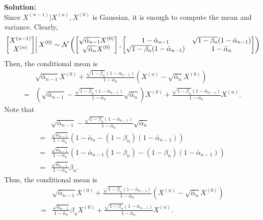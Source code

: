\documentclass[12pt]{article}
\begin{document}
\begin{enumerate}
\begin{solution}
{\bf Solution:}\\
Since $X^{(n-1)}|X^{(n)}, X^{(0)}$ is Gaussian, it is enough to compute the mean and variance.
Clearly,
    \begin{align}
        \left.\begin{bmatrix}
            X^{(n-1)}\\X^{(n)} 
        \end{bmatrix}
        \right| X^{(0)}
        \sim {\mathcal{N}}\left(\begin{bmatrix}\sqrt{\bar{\alpha}_{n-1}}X^{(0)} \\ \sqrt{\bar{\alpha}_{n}}X^{(0)} \\\end{bmatrix},
        \begin{bmatrix}1-\bar{\alpha}_{n-1} & \sqrt{1-\beta_n} (1-\bar{\alpha}_{n-1}) \\
        \sqrt{1-\beta_n} (1-\bar{\alpha}_{n-1}) & 1-\bar{\alpha}_n\end{bmatrix}\right)
    \end{align}
Then, the conditional mean is
\begin{align}
    &\sqrt{\bar{\alpha}_{n-1}} X^{(0)} +\frac{\sqrt{1-\beta_n}(1-\bar{\alpha}_{n-1})}{1-\bar{\alpha}_n} (X^{(n)} - \sqrt{\bar{\alpha}_n}X^{(0)})\nonumber\\
    =& \left(\sqrt{\bar{\alpha}_{n-1}} - \frac{\sqrt{1-\beta_n}(1-\bar{\alpha}_{n-1})}{1-\bar{\alpha}_n} \sqrt{\bar{\alpha}_n}\right) X^{(0)}
    +\frac{\sqrt{1-\beta_n}(1-\bar{\alpha}_{n-1})}{1-\bar{\alpha}_n} X^{(n)} .
\end{align}
Note that 
\begin{align}
    & \sqrt{\bar{\alpha}_{n-1}} - \frac{\sqrt{1-\beta_n}(1-\bar{\alpha}_{n-1})}{1-\bar{\alpha}_n} \sqrt{\bar{\alpha}_n}\nonumber\\
    =& \frac{\sqrt{\bar{\alpha}_{n-1}}}{1-\bar{\alpha}_n} (1-\bar{\alpha}_n - (1-\beta_n) (1-\bar{\alpha}_{n-1}))\\
    =& \frac{\sqrt{\bar{\alpha}_{n-1}}}{1-\bar{\alpha}_n} (1-\bar{\alpha}_{n-1}(1-\beta_n) - (1-\beta_n) (1-\bar{\alpha}_{n-1}))\\
    =& \frac{\sqrt{\bar{\alpha}_{n-1}}}{1-\bar{\alpha}_n} \beta_n.
\end{align}
Thus, the conditional mean is
\begin{align}
    &\sqrt{\bar{\alpha}_{n-1}} X^{(0)} +\frac{\sqrt{1-\beta_n}(1-\bar{\alpha}_{n-1})}{1-\bar{\alpha}_n} (X^{(n)} - \sqrt{\bar{\alpha}_n}X^{(0)})\nonumber\\
    =& \frac{\sqrt{\bar{\alpha}_{n-1}}}{1-\bar{\alpha}_n} \beta_n X^{(0)}
    +\frac{\sqrt{1-\beta_n}(1-\bar{\alpha}_{n-1})}{1-\bar{\alpha}_n} X^{(n)}.
\end{align}


\end{solution}
\end{enumerate}
\end{document}
